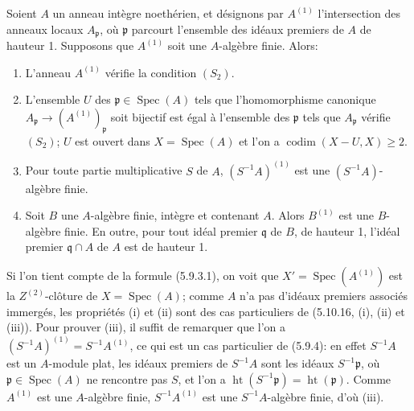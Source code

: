 \begin{proposition}[5.10.17]
\label{IV.2.s5.10.17-fr}
Soient $A$ un anneau intègre noethérien, et désignons par $A^{(1)}$
l'intersection des anneaux locaux $A_{\mathfrak p}$, où $\mathfrak p$
parcourt l'ensemble des idéaux premiers de $A$ de hauteur 1. Supposons que
$A^{(1)}$ soit une $A$-algèbre finie. Alors:
\begin{enumerate}
\item[(i)] L'anneau $A^{(1)}$ vérifie la condition $(S_2)$.
\item[(ii)] L'ensemble $U$ des $\mathfrak p\in\operatorname{Spec}(A)$ tels
que l'homomorphisme canonique
$A_{\mathfrak p}\to(A^{(1)})_{\mathfrak p}$ soit bijectif est égal à
l'ensemble des $\mathfrak p$ tels que $A_{\mathfrak p}$ vérifie $(S_2)$; $U$
est ouvert dans $X=\operatorname{Spec}(A)$ et l'on a
$\operatorname{codim}(X-U,X)\geq2$.
\item[(iii)] Pour toute partie multiplicative $S$ de $A$, $(S^{-1}A)^{(1)}$
est une $(S^{-1}A)$-algèbre finie.
\item[(iv)] Soit $B$ une $A$-algèbre finie, intègre et contenant $A$. Alors
$B^{(1)}$ est une $B$-algèbre finie. En outre, pour tout idéal premier
$\mathfrak q$ de $B$, de hauteur 1, l'idéal premier $\mathfrak q\cap A$ de
$A$ est de hauteur 1.
\end{enumerate}
\end{proposition}

Si l'on tient compte de la formule (5.9.3.1), on voit que
$X'=\operatorname{Spec}(A^{(1)})$ est la $Z^{(2)}$-clôture de
$X=\operatorname{Spec}(A)$; comme $A$ n'a pas d'idéaux premiers associés
immergés, les propriétés (i) et (ii) sont des cas particuliers de (5.10.16,
(i), (ii) et (iii)). Pour prouver (iii), il suffit de remarquer que l'on a
$(S^{-1}A)^{(1)}=S^{-1}A^{(1)}$, ce qui est un cas particulier de (5.9.4): en
effet $S^{-1}A$ est un $A$-module plat, les idéaux premiers de $S^{-1}A$ sont
les idéaux $S^{-1}\mathfrak p$, où $\mathfrak p\in\operatorname{Spec}(A)$ ne
rencontre pas $S$, et l'on a
$\operatorname{ht}(S^{-1}\mathfrak p)=\operatorname{ht}(\mathfrak p)$. Comme
$A^{(1)}$ est une $A$-algèbre finie, $S^{-1}A^{(1)}$ est une
$S^{-1}A$-algèbre finie, d'où (iii).

